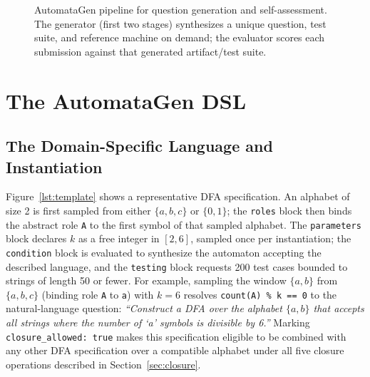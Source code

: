 \documentclass[sigconf]{acmart}
\begin{document}
\begin{figure}[h]
\centering
{}
\caption{AutomataGen pipeline for question generation and self-assessment. The generator (first two stages) synthesizes a unique question, test suite, and reference machine on demand; the evaluator scores each submission against that generated artifact/test suite.}
\label{fig:arch}
\end{figure}

\section{The AutomataGen DSL}

\subsection{The Domain-Specific Language and Instantiation}
Figure~\ref{lst:template} shows a representative DFA specification. An alphabet of size 2 is first sampled from either $\{a,b,c\}$ or $\{0,1\}$; the \texttt{roles} block then binds the abstract role \texttt{A} to the first symbol of that sampled alphabet. The \texttt{parameters} block declares $k$ as a free integer in $[2,6]$, sampled once per instantiation; the \texttt{condition} block is evaluated to synthesize the automaton accepting the described language, and the \texttt{testing} block requests 200 test cases bounded to strings of length 50 or fewer. For example, sampling the window $\{a,b\}$ from $\{a,b,c\}$ (binding role \texttt{A} to \texttt{a}) with $k=6$ resolves \texttt{count(A) \% k == 0} to the natural-language question: \textit{``Construct a DFA over the alphabet $\{a, b\}$ that accepts all strings where the number of `a' symbols is divisible by 6.''} Marking \texttt{closure\_allowed: true} makes this specification eligible to be combined with any other DFA specification over a compatible alphabet under all five closure operations described in Section~\ref{sec:closure}.
\end{document}
